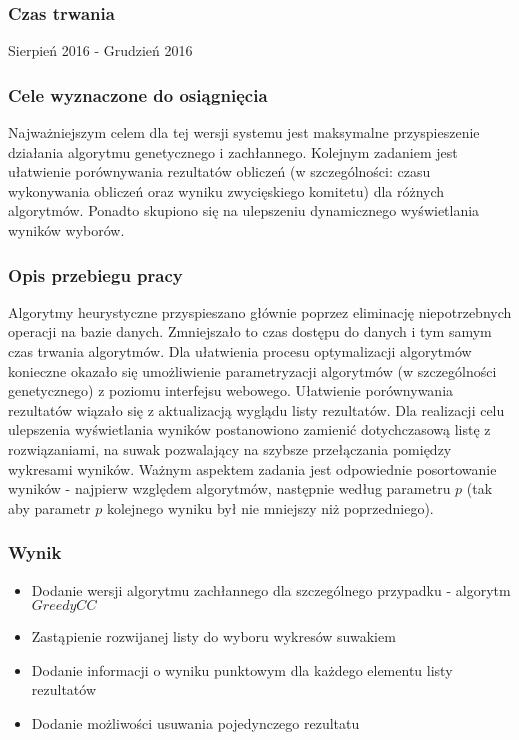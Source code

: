 \documentclass[pdflatex,11pt]{../aghdoc_version2}
\begin{document}
\subsubsection{Czas trwania}
Sierpień 2016 - Grudzień 2016
\subsubsection{Cele wyznaczone do osiągnięcia}
Najważniejszym celem dla tej wersji systemu jest maksymalne przyspieszenie działania
algorytmu genetycznego i zachłannego.
Kolejnym zadaniem jest ułatwienie porównywania rezultatów obliczeń (w szczególności:
czasu wykonywania obliczeń oraz wyniku zwycięskiego komitetu) dla różnych algorytmów.
Ponadto skupiono się na ulepszeniu dynamicznego wyświetlania wyników wyborów.
\subsubsection{Opis przebiegu pracy}
Algorytmy heurystyczne przyspieszano głównie poprzez eliminację niepotrzebnych operacji
na bazie danych. Zmniejszało to czas dostępu do danych i tym samym czas trwania
algorytmów. Dla ułatwienia procesu optymalizacji algorytmów konieczne okazało się
umożliwienie parametryzacji algorytmów (w szczególności genetycznego) z poziomu
interfejsu webowego. Ułatwienie porównywania rezultatów wiązało się z aktualizacją
wyglądu listy rezultatów. Dla realizacji celu ulepszenia wyświetlania wyników postanowiono
zamienić dotychczasową listę z rozwiązaniami, na suwak pozwalający na szybsze
przełączania pomiędzy wykresami wyników. Ważnym aspektem zadania jest odpowiednie
posortowanie wyników - najpierw względem algorytmów, następnie według parametru $p$ (tak
aby parametr $p$ kolejnego wyniku był nie mniejszy niż poprzedniego).
\subsubsection{Wynik}
\begin{itemize}
\item Dodanie wersji algorytmu zachłannego dla szczególnego przypadku - algorytm $Greedy CC$
\item Zastąpienie rozwijanej listy do wyboru wykresów suwakiem
\item Dodanie informacji o wyniku punktowym dla każdego elementu listy rezultatów
\item Dodanie możliwości usuwania pojedynczego rezultatu
\end{itemize}
\end{document}
